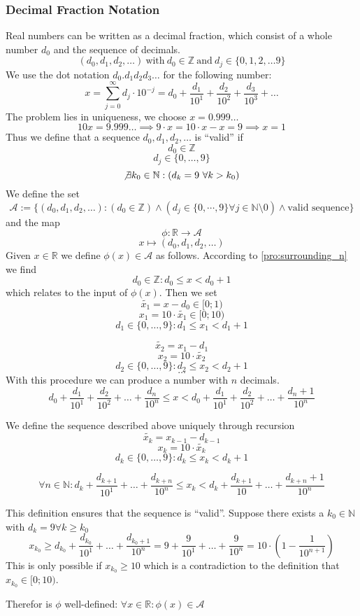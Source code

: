 \subsubsection{Decimal Fraction Notation}
Real numbers can be written as a decimal fraction, which consist of a whole number \(d_0\) and the sequence of decimals.
\[(d_0, d_1, d_2,\ldots)~\text{with}~d_0 \in \mathbb{Z}~\text{and}~d_j \in \{0, 1, 2, \ldots 9\}\]
We use the dot notation \(d_0.d_1d_2d_3\ldots\) for the following number:
\[x = \sum_{j=0}^\infty d_j \cdot 10^{-j} = d_0 + \frac{d_1}{10^1} + \frac{d_2}{10^2} + \frac{d_3}{10^3}+\ldots\]
The problem lies in uniqueness, we choose \(x = 0.999\ldots\)
\[10x = 9.999\ldots \implies 9 \cdot x = 10 \cdot x - x = 9 \implies x = 1\]
Thus we define that a sequence \(d_0, d_1, d_2,\ldots\) is ``valid'' if
\[d_0 \in \mathbb{Z}\]
\[d_j \in \{0, \ldots, 9\}\]
\[\not\exists k_0 \in \mathbb{N}: (d_k = 9~\forall k > k_0)\]
We define the set
\[\mathcal{A} := \{(d_0, d_1, d_2,\ldots): (d_0 \in \mathbb{Z}) \land (d_j \in \{0, \cdots, 9\} \forall j \in \mathbb{N}\setminus 0) \land \text{valid sequence}\}\]
and the map
\[\phi: \mathbb{R} \to \mathcal{A}\]
\[x \mapsto (d_0, d_1, d_2, \ldots)\]
Given \(x \in \mathbb{R}\) we define \(\phi(x) \in \mathcal{A}\) as follows.
According to \cref{pro:surrounding_n} we find
\[d_0 \in \mathbb{Z}: d_0 \leq x < d_0 + 1\]
which relates to the input of \(\phi(x)\).
Then we set
\[\widetilde{x_1} = x - d_0 \in [0;1)\]
\[x_1 = 10 \cdot \widetilde{x_1} \in [0;10)\]
\[d_1 \in \{0,\ldots,9\}: d_1 \leq x_1 < d_1 + 1\]

\[\widetilde{x_2} = x_1 - d_1\]
\[x_2 = 10 \cdot \widetilde{x_2}\]
\[d_2 \in \{0,\ldots,9\}: d_2 \leq x_2 < d_2 + 1\]
\[\ldots\]
With this procedure we can produce a number with \(n\) decimals.
\[d_0 + \frac{d_1}{10^1} + \frac{d_2}{10^2} + \ldots + \frac{d_n}{10^n} \leq x < d_0 + \frac{d_1}{10^1} + \frac{d_2}{10^2} + \ldots + \frac{d_n + 1}{10^n}\]

\begin{definition}
   We define the sequence described above uniquely through recursion
   \[\widetilde{x_k} = x_{k-1} - d_{k-1}\]
   \[x_k = 10 \cdot \widetilde{x_k}\]
   \[d_k \in \{0,\ldots,9\}: d_k \leq x_k < d_k + 1\]

   \[\forall n \in \mathbb{N}: d_k + \frac{d_{k+1}}{10^1} + \ldots + \frac{d_{k+n}}{10^n} \leq x_k < d_k + \frac{d_{k+1}}{10} + \ldots + \frac{d_{k+n} + 1}{10^n}\]
\end{definition}
\begin{remark}
   This definition ensures that the sequence is ``valid''.
   Suppose there exists a \(k_0 \in \mathbb{N}\) with \(d_k = 9 \forall k \geq k_0\)
   \[x_{k_0} \geq d_{k_{0}} + \frac{d_{k_0}}{10^1} + \ldots + \frac{d_{k_0 + 1}}{10^n} = 9 + \frac{9}{10^1} + \ldots + \frac{9}{10^n} = 10 \cdot \left(1 - \frac{1}{10^{n+1}}\right)\]
   This is only possible if \(x_{k_{0}} \geq 10\) which is a contradiction to the definition that \(x_{k_0} \in [0;10)\).

   Therefor is \(\phi\) well-defined: \(\forall x \in \mathbb{R}: \phi(x) \in \mathcal{A}\)
\end{remark}

